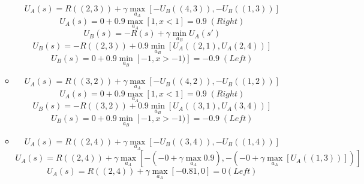 \documentclass[11pt]{article}
\newenvironment{problem}[2][Problem]{\begin{trivlist}
\item[\hskip \labelsep {\bfseries #1}\hskip \labelsep {\bfseries #2.}]}{\end{trivlist}}
\begin{document}
\begin{problem}{2}
\begin{enumerate}
\begin{itemize}
\begin{equation}
				\end{equation}
				\begin{equation}
					U_A (s) = R((2,3)) + \gamma \max_{a_A} \left[ -U_B ((4,3)), -U_B((1,3)) \right]
				\end{equation}
				\begin{equation}
					U_A (s) = 0 + 0.9 \max_{a_A} \left[ 1, x < 1 \right] = 0.9 \; (Right)
				\end{equation}
				\begin{equation}
					U_B (s) = -R(s) + \gamma \min_{a_B} U_A (s')
				\end{equation}
				\begin{equation}
					U_B (s) = -R((2,3)) + 0.9 \min_{a_B} \left[ U_A ((2,1), U_A(2,4))  \right]
				\end{equation}
				\begin{equation}
					U_B (s) = 0 + 0.9 \min_{a_B} \left[ -1, x > -1)  \right] = -0.9 \; (Left)
				\end{equation}
			\item[(A = 3, B = 2)]
				\begin{equation}
					U_A (s) = R((3,2)) + \gamma \max_{a_A} \left[ -U_B ((4,2)), -U_B((1,2)) \right]
				\end{equation}
				\begin{equation}
					U_A (s) = 0 + 0.9 \max_{a_A} \left[ 1, x < 1 \right] = 0.9 \; (Right)
				\end{equation}
				\begin{equation}
					U_B (s) = -R((3,2)) + 0.9 \min_{a_B} \left[ U_A ((3,1), U_A(3,4))  \right]
				\end{equation}
				\begin{equation}
					U_B (s) = 0 + 0.9 \min_{a_B} \left[ -1, x > -1)  \right] = -0.9 \; (Left)
				\end{equation}
			\item[(A = 2, B = 4)]
				\begin{equation}
					U_A (s) = R((2,4)) + \gamma \max_{a_A} \left[ -U_B ((3,4)), -U_B((1,4)) \right]
				\end{equation}
				\begin{equation}
					U_A (s) = R((2,4)) + \gamma \max_{a_A} \left[ -\left( -0 + \gamma \max_{a_A} 0.9 \right), -\left( -0 + \gamma \max_{a_A} \left[ U_A((1,3)) \right] \right) \right]
				\end{equation}
				\begin{equation}
					U_A (s) = R((2,4)) + \gamma \max_{a_A} \left[ -0.81, 0 \right] = 0 (Left)
				\end{equation}

\end{itemize}
\end{enumerate}
\end{problem}
\end{document}

